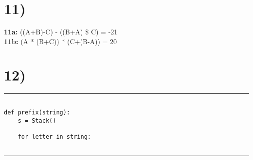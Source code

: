 \documentclass[a4paper,11pt]{article}
\begin{document}

\section*{11)}
{\bf 11a:} ((A+B)-C) - ((B+A) \$ C) = -21 \\
{\bf 11b:} (A * (B+C)) * (C+(B-A)) = 20



\section*{12)}

\noindent\rule{\linewidth}{0.1pt}
\begin{verbatim}

def prefix(string):
    s = Stack()
    
    for letter in string:
        

\end{verbatim}
\noindent\rule{\linewidth}{0.1pt}

\end{document}
